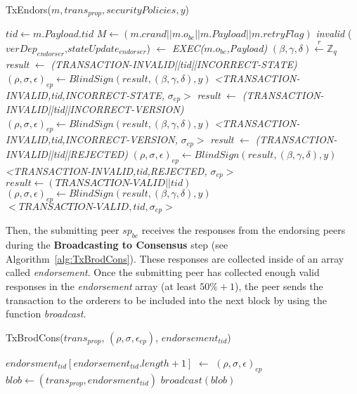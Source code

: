 \documentclass[conference]{llncs}
\begin{document}
\begin{algorithm}[ht]
\caption{TxEndors($m,trans_{prop},securityPolicies,y$)}
\label{alg:TxEndors}
\begin{algorithmic}[1]
\STATE $tid \gets m.Payload.tid$
\STATE $M \gets (m.crand\vert\vert m.o_{bc} \vert\vert m.Payload \vert\vert m.retryFlag)$
  \RETURN \emph{invalid} \ELSE
\STATE ($verDep_{endorser}$,$stateUpdate_{endorser}$) $\gets$  \emph{EXEC(}$m.o_{bc}$\emph{,Payload)} \ENDIF
\STATE $(\beta,\gamma,\delta)\xleftarrow[]{r}\mathbb{Z}_q$  
\STATE \emph{result} $\gets$ \emph{(\textit{TRANSACTION-INVALID}||tid||\textit{INCORRECT-STATE})}
\STATE $(\rho,\sigma,\epsilon)_{ep} \gets BlindSign(result,(\beta,\gamma,\delta),y)$
\RETURN \emph{<\textit{TRANSACTION-INVALID},tid,\textit{INCORRECT-STATE},} $\sigma_{ep}>$ 
\STATE \emph{result} $\gets$ \emph{(\textit{TRANSACTION-INVALID}||tid||\textit{INCORRECT-VERSION})}
\STATE $(\rho,\sigma,\epsilon)_{ep} \gets BlindSign(result,(\beta,\gamma,\delta),y)$
\RETURN \emph{<\textit{TRANSACTION-INVALID},tid,\textit{INCORRECT-VERSION},} $\sigma_{ep}>$ 
\STATE \emph{result} $\gets$ \emph{(\textit{TRANSACTION-INVALID}||tid||\textit{REJECTED})}
\STATE $(\rho,\sigma,\epsilon)_{ep} \gets BlindSign(result,(\beta,\gamma,\delta),y)$
\RETURN \emph{<\textit{TRANSACTION-INVALID},tid,\textit{REJECTED},} $\sigma_{ep}>$
\ELSE  
\STATE $result \gets (\textit{TRANSACTION-VALID}||tid)$
\STATE $(\rho,\sigma,\epsilon)_{ep} \gets BlindSign(result,(\beta,\gamma,\delta),y)$
\RETURN $<\textit{TRANSACTION-VALID},tid,\sigma_{ep}>$
\ENDIF
\end{algorithmic}
\end{algorithm}

Then, the submitting peer $sp_{bc}$ receives the responses from the endorsing peers during the \textbf{Broadcasting to Consensus} step (see Algorithm~\ref{alg:TxBrodCons}). These responses are collected inside of an array called \textit{endorsement}. Once the submitting peer has collected enough valid responses in the \textit{endorsement} array (at least $50\%+1$), the peer sends the transaction to the orderers to be included into the next block by using the function \textit{broadcast}. 

\begin{algorithm}[ht]
\caption{TxBrodCons($trans_{prop}$, $(\rho,\sigma,\epsilon_{ep})$, $endorsement_{tid}$)}
\label{alg:TxBrodCons}
\begin{algorithmic}[1]
\STATE $endorsment_{tid}[endorsement_{tid}.length+1]$ $\gets$ $(\rho,\sigma,\epsilon)_{ep}$
\STATE $blob \gets (trans_{prop},endorsment_{tid})$
\RETURN $broadcast(blob)$
\ENDIF
\end{algorithmic}
\end{algorithm}
\end{document}
